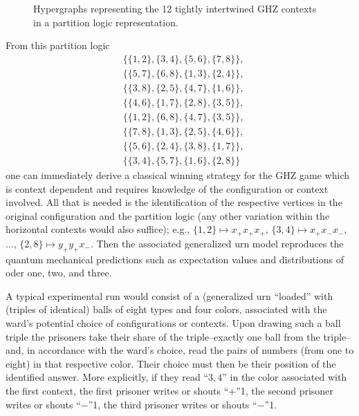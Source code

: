 \begin{figure}[htb!]
\begin{center}
\end{center}
\caption{\label{2020-f-ghz-contextpl}
Hypergraphs representing  the 12 tightly intertwined GHZ contexts in a partition logic representation.
}
\end{figure}

From this partition logic
\begin{equation}
\begin{aligned}
&\{
\{1,2\},\{3,4\},\{5,6\},\{7,8\}
\},\\
&\{
\{5,7\},\{6,8\},\{1,3\},\{2,4\}
\},\\
&\{
\{3,8\},\{2,5\},\{4,7\},\{1,6\}
\},\\
&\{
\{4,6\},\{1,7\},\{2,8\},\{3,5\}
\},\\
&\{
\{1,2\},\{6,8\},\{4,7\},\{3,5\}
\},\\
&\{
\{7,8\},\{1,3\},\{2,5\},\{4,6\}
\},\\
&\{
\{5,6\},\{2,4\},\{3,8\},\{1,7\}
\},\\
&\{
\{3,4\},\{5,7\},\{1,6\},\{2,8\}
\}
\end{aligned}
\label{2020-ghz-e-pl}
\end{equation}
one can immediately derive a classical winning strategy for the GHZ game which is context dependent and requires knowledge of the configuration or context involved.
All that is needed is the identification of the respective vertices in the original configuration and the partition logic
(any other variation within the horizontal contexts would also suffice);
e.g.,
$\{1,2\} \mapsto x_+x_+x_+$,
$\{3,4\} \mapsto x_+x_-x_-$, $\ldots$,
$\{2,8\} \mapsto y_+y_+x_-$.
Then the associated generalized urn model reproduces the quantum mechanical predictions such as expectation values and distributions of oder one, two, and three.

A typical experimental run would consist of a (generalized urn ``loaded'' with (triples of identical) balls of eight types and four colors, associated with
the ward's potential choice of configurations or contexts.
Upon drawing such a ball triple the prisoners take their share of the triple--exactly one ball from the triple--and, in accordance with the ward's choice,
read the pairs of numbers (from one to eight) in that respective color. Their choice must then be their position of the identified answer.
More explicitly, if they read ``$3,4$'' in the color associated with the first context,
the first prisoner writes or shouts ``$+$''1,
the second prisoner writes or shouts ``$-$''1,
the third prisoner writes or shouts ``$-$''1.


